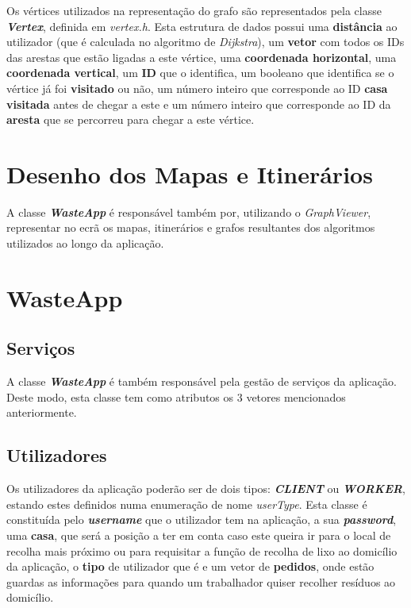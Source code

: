 \documentclass[article, a4paper, 12pt, oneside]{memoir}
\begin{document}
Os vértices utilizados na representação do grafo são representados pela classe \textbf{\textit{Vertex}}, definida em \textit{vertex.h}. Esta estrutura de dados possui uma \textbf{distância} ao utilizador (que é calculada no algoritmo de \textit{Dijkstra}), um \textbf{vetor} com todos os IDs das arestas que estão ligadas a este vértice, uma \textbf{coordenada horizontal}, uma \textbf{coordenada vertical}, um \textbf{ID} que o identifica, um booleano que identifica se o vértice já foi \textbf{visitado} ou não, um número inteiro que corresponde ao ID \textbf{casa visitada} antes de chegar a este e um número inteiro que corresponde ao ID da \textbf{aresta} que se percorreu para chegar a este vértice.

\section{Desenho dos Mapas e Itinerários}

A classe \textbf{\textit{WasteApp}} é responsável também por, utilizando o \textit{GraphViewer}, representar no ecrã os mapas, itinerários e grafos resultantes dos algoritmos utilizados ao longo da aplicação.

\section{WasteApp}

\subsection{Serviços}

A classe \textbf{\textit{WasteApp}} é também responsável pela gestão de serviços da aplicação. Deste modo, esta classe tem como atributos os 3 vetores mencionados anteriormente.

\subsection{Utilizadores}

Os utilizadores da aplicação poderão ser de dois tipos: \textit{\textbf{CLIENT}} ou \textbf{\textit{WORKER}}, estando estes definidos numa enumeração de nome \textit{userType}. Esta classe é constituída pelo \textit{\textbf{username}} que o utilizador tem na aplicação, a sua \textit{\textbf{password}}, uma \textbf{casa}, que será a posição a ter em conta caso este queira ir para o local de recolha mais próximo ou para requisitar a função de recolha de lixo ao domicílio da aplicação, o \textbf{tipo} de utilizador que é e um vetor de \textbf{pedidos}, onde estão guardas as informações para quando um trabalhador quiser recolher resíduos ao domicílio.
\end{document}
